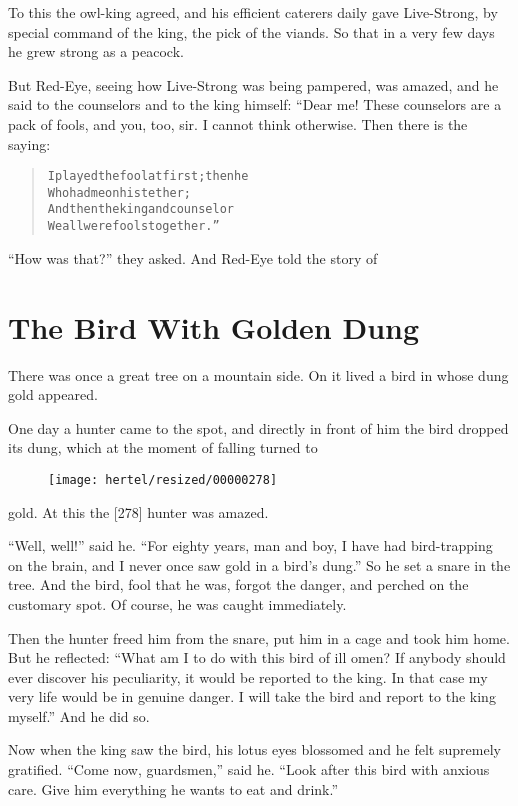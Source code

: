 \documentclass[article, twoside, 10pt]{memoir}
\renewenvironment{verbatim}{%
\begin{quote}%
\vskip -10pt%
\begin{alltt}\normalfont\small}{\end{alltt}%
\end{quote}%
\vskip -10pt
} %
\begin{document}
To this the owl-king agreed, and his efficient caterers daily gave
Live-Strong, by special command of the king, the pick of the
viands. So that in a very few days he grew strong as a peacock.

But Red-Eye, seeing how Live-Strong was being pampered, was amazed,
and he said to the counselors and to the king himself: “Dear me!
These counselors are a pack of fools, and you, too, sir. I cannot
think otherwise. Then there is the saying:

\begin{verbatim}
I played the fool at first; then he
    Who had me on his tether;
And then the king and counselor{\textemdash}
    We all were fools together.”
\end{verbatim}
``How was that?'' they asked. And Red-Eye told the story of

\chapter{The Bird With Golden Dung}

There was once a great tree on a mountain side. On it lived a bird
in whose dung gold appeared.

One day a hunter came to the spot, and directly in front of him the
bird dropped its dung, which at the moment of falling turned to
\begin{figure}[p]\texttt{[image: hertel/resized/00000278]}\end{figure}gold. At this the [278] hunter was amazed.

``Well, well!'' said he.
``For eighty years, man and boy, I have had bird-trapping on the brain, and I never once saw gold in a bird's dung.''
So he set a snare in the tree. And the bird, fool that he was,
forgot the danger, and perched on the customary spot. Of course, he
was caught immediately.

Then the hunter freed him from the snare, put him in a cage and
took him home. But he reflected:
``What am I to do with this bird of ill omen? If anybody should ever discover his peculiarity, it would be reported to the king. In that case my very life would be in genuine danger. I will take the bird and report to the king myself.''
And he did so.

Now when the king saw the bird, his lotus eyes blossomed and he
felt supremely gratified. ``Come now, guardsmen,'' said he.
``Look after this bird with anxious care. Give him everything he wants to eat and drink.''
\end{document}
